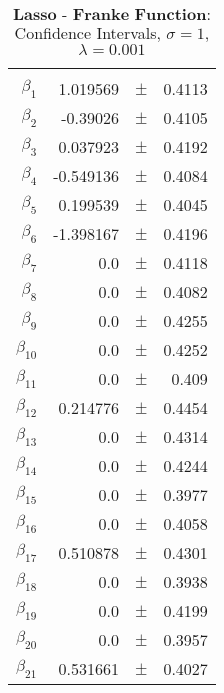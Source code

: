 \documentclass[...,numrefs]{wiley-article}
\begin{document}
\begin{table}[h]
    \centering
    \caption{$\textbf{Lasso - Franke Function:}$ Confidence Intervals, $\sigma = 1$, $\lambda = 0.001$}
    \begin{tabular}{rrrr}
    \hline
    \\
    $\beta_{1}$ & 1.019569 & $\pm$ & 0.4113 \\
    $\beta_{2}$ & -0.39026 & $\pm$ & 0.4105 \\
    $\beta_{3}$ & 0.037923 & $\pm$ & 0.4192 \\
    $\beta_{4}$ & -0.549136 & $\pm$ & 0.4084 \\
    $\beta_{5}$ & 0.199539 & $\pm$ & 0.4045 \\
    $\beta_{6}$ & -1.398167 & $\pm$ & 0.4196 \\
    $\beta_{7}$ & 0.0 & $\pm$ & 0.4118 \\
    $\beta_{8}$ & 0.0 & $\pm$ & 0.4082 \\
    $\beta_{9}$ & 0.0 & $\pm$ & 0.4255 \\
    $\beta_{10}$ & 0.0 & $\pm$ & 0.4252 \\
    $\beta_{11}$ & 0.0 & $\pm$ & 0.409 \\
    $\beta_{12}$ & 0.214776 & $\pm$ & 0.4454 \\
    $\beta_{13}$ & 0.0 & $\pm$ & 0.4314 \\
    $\beta_{14}$ & 0.0 & $\pm$ & 0.4244 \\
    $\beta_{15}$ & 0.0 & $\pm$ & 0.3977 \\
    $\beta_{16}$ & 0.0 & $\pm$ & 0.4058 \\
    $\beta_{17}$ & 0.510878 & $\pm$ & 0.4301 \\
    $\beta_{18}$ & 0.0 & $\pm$ & 0.3938 \\
    $\beta_{19}$ & 0.0 & $\pm$ & 0.4199 \\
    $\beta_{20}$ & 0.0 & $\pm$ & 0.3957 \\
    $\beta_{21}$ & 0.531661 & $\pm$ & 0.4027 \\
    \hline
    \end{tabular}

    \label{last}
\end{table}




\end{document}
